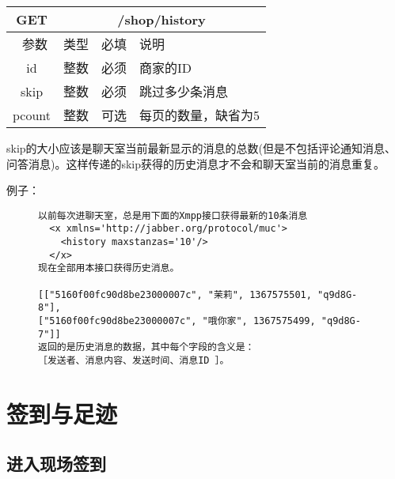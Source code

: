 \documentclass[cs4size]{ctexartutf8}
\begin{document}
\begin{table}[H]
   \begin{center}
\begin{tabular}{|c|c|c|p{12cm}|}
\hline
GET & \multicolumn{3}{|c|}{/shop/history} \\
\hline\hline
 \  参数  & 类型 & 必填 &  说明  \\
\hline
 id  & 整数 & 必须 & 商家的ID\\
   \hline
 skip  & 整数 & 必须 & 跳过多少条消息\\ 
 \hline
 pcount  & 整数 & 可选 & 每页的数量，缺省为5\\ 
\hline
\end{tabular}
   \end{center}
\end{table}

skip的大小应该是聊天室当前最新显示的消息的总数(但是不包括评论通知消息、问答消息)。这样传递的skip获得的历史消息才不会和聊天室当前的消息重复。

例子：

\begin{figure}[H]
\begin{verbatim}
以前每次进聊天室，总是用下面的Xmpp接口获得最新的10条消息
  <x xmlns='http://jabber.org/protocol/muc'>
    <history maxstanzas='10'/>
  </x>
现在全部用本接口获得历史消息。
  
[["5160f00fc90d8be23000007c", "茉莉", 1367575501, "q9d8G-8"], 
["5160f00fc90d8be23000007c", "哦你家", 1367575499, "q9d8G-7"]]
返回的是历史消息的数据，其中每个字段的含义是：
［发送者、消息内容、发送时间、消息ID ］。
\end{verbatim}
\end{figure}



\section{签到与足迹}

\subsection{进入现场签到}
\end{document}
